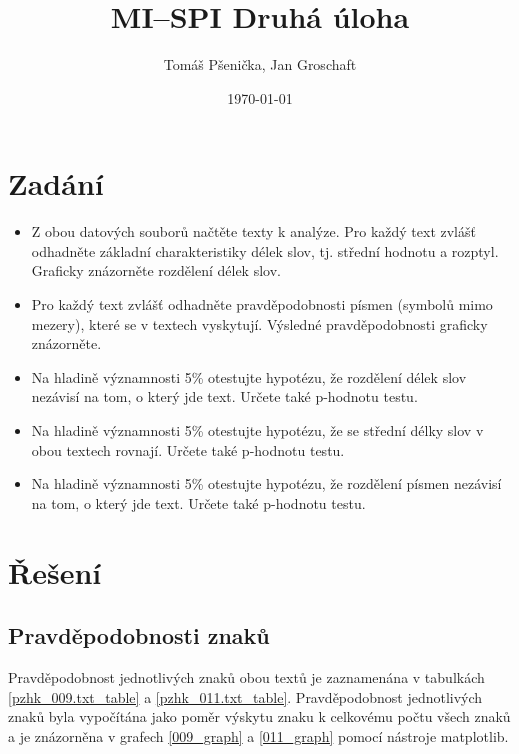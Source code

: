 \documentclass[12pt]{article}
\title{MI--SPI Druhá úloha}
\author{Tomáš Pšenička, Jan Groschaft}
\date{\today}
\begin{document}
 
\begin{titlingpage}
	\maketitle
\end{titlingpage}
 	
	\newpage
 
	\tableofcontents

	\newpage

 	\section{Zadání}
 	
 	\begin{itemize}
 		\item Z obou datových souborů načtěte texty k analýze. Pro každý text zvlášť odhadněte základní charakteristiky délek slov, tj. střední hodnotu a rozptyl. Graficky znázorněte rozdělení délek slov.
  		\item Pro každý text zvlášť odhadněte pravděpodobnosti písmen (symbolů mimo mezery), které se v textech vyskytují. Výsledné pravděpodobnosti graficky znázorněte.
 		\item Na hladině významnosti 5\% otestujte hypotézu, že rozdělení délek slov nezávisí na tom, o který jde text. Určete také p-hodnotu testu. 		
 		\item Na hladině významnosti 5\% otestujte hypotézu, že se střední délky slov v obou textech rovnají. Určete také p-hodnotu testu.
		\item Na hladině významnosti 5\% otestujte hypotézu, že rozdělení písmen nezávisí na tom, o který jde text. Určete také p-hodnotu testu.
 	\end{itemize}
   		
   		
	\section{Řešení}\label{r}
		\subsection{Pravděpodobnosti znaků}\label{pz}
			Pravděpodobnost jednotlivých znaků obou textů je zaznamenána v tabulkách \ref{pzhk_009.txt_table} a \ref{pzhk_011.txt_table}. Pravděpodobnost jednotlivých znaků byla vypočítána jako poměr výskytu znaku k celkovému počtu všech znaků a je znázorněna v grafech \ref{009_graph} a \ref{011_graph} pomocí nástroje matplotlib.
						
\end{document}
